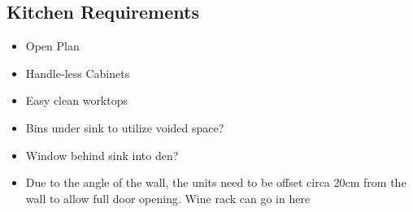 \subsection{Kitchen Requirements}
\begin{itemize}
\item Open Plan
\item Handle-less Cabinets
\item Easy clean worktops
\item Bins under sink to utilize voided space?
\item Window behind sink into den?
\item Due to the angle of the wall, the units need to be offset circa 20cm from the wall to allow full door opening. Wine rack can go in here
    
\end{itemize}
